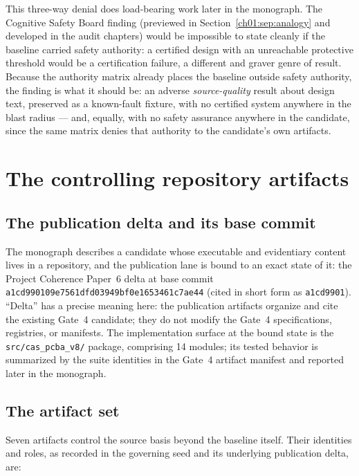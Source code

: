 This three-way denial does load-bearing work later in the monograph.
The Cognitive Safety Board finding (previewed in
Section~\ref{ch01:sep:analogy} and developed in the audit chapters)
would be impossible to state cleanly if the baseline carried safety
authority: a certified design with an unreachable protective threshold
would be a certification failure, a different and graver genre of
result. Because the authority matrix already places the baseline
outside safety authority, the finding is what it should be: an adverse
\emph{source-quality} result about design text, preserved as a
known-fault fixture, with no certified system anywhere in the blast
radius --- and, equally, with no safety assurance anywhere in the
candidate, since the same matrix denies that authority to the
candidate's own artifacts.

\section{The controlling repository artifacts}\label{ch03:artifacts}

\subsection{The publication delta and its base commit}\label{ch03:artifacts:commit}

The monograph describes a candidate whose executable and evidentiary
content lives in a repository, and the publication lane is bound to an
exact state of it: the Project Coherence Paper~6 delta at base commit
\texttt{a1cd990109e7561dfd03949bf0e1653461c7ae44} (cited in short form
as \texttt{a1cd9901}). ``Delta'' has a precise meaning here: the
publication artifacts organize and cite the existing Gate~4 candidate;
they do not modify the Gate~4 specifications, registries, or manifests.
The implementation surface at the bound state is the
\texttt{src/cas\_pcba\_v8/} package, comprising 14 modules; its tested
behavior is summarized by the suite identities in the Gate~4 artifact
manifest and reported later in the monograph.

\subsection{The artifact set}\label{ch03:artifacts:set}

Seven artifacts control the source basis beyond the baseline itself.
Their identities and roles, as recorded in the governing seed and its
underlying publication delta, are:

